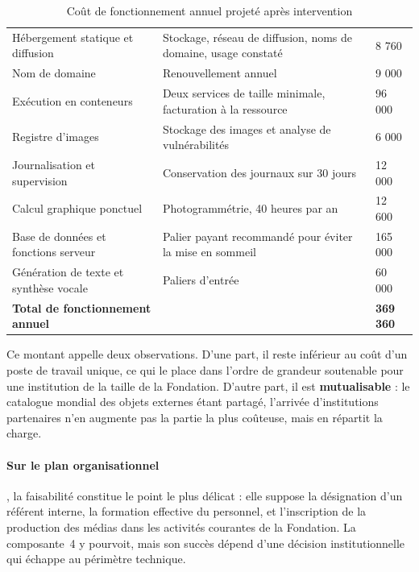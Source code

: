 \begin{table}[htbp]
\centering
\caption{Coût de fonctionnement annuel projeté après intervention}
\label{tab:coutfonctionnement}
\small
\begin{tabularx}{\textwidth}{|L{4.6cm}|X|R{2.6cm}|}
\hline
{}
 &  &  \\ \hline
Hébergement statique et diffusion & Stockage, réseau de diffusion, noms de domaine, usage constaté & 8 760 \\ \hline
Nom de domaine & Renouvellement annuel & 9 000 \\ \hline
Exécution en conteneurs & Deux services de taille minimale, facturation à la ressource & 96 000 \\ \hline
Registre d'images & Stockage des images et analyse de vulnérabilités & 6 000 \\ \hline
Journalisation et supervision & Conservation des journaux sur 30 jours & 12 000 \\ \hline
Calcul graphique ponctuel & Photogrammétrie, 40 heures par an & 12 600 \\ \hline
Base de données et fonctions serveur & Palier payant recommandé pour éviter la mise en sommeil & 165 000 \\ \hline
Génération de texte et synthèse vocale & Paliers d'entrée & 60 000 \\ \hline
{}
\textbf{Total de fonctionnement annuel} & & \textbf{369 360} \\ \hline
\end{tabularx}
\end{table}

Ce montant appelle deux observations. D'une part, il reste inférieur au coût
d'un poste de travail unique, ce qui le place dans l'ordre de grandeur
soutenable pour une institution de la taille de la Fondation. D'autre part, il
est \textbf{mutualisable} : le catalogue mondial des objets externes étant
partagé, l'arrivée d'institutions partenaires n'en augmente pas la partie la
plus coûteuse, mais en répartit la charge.

\paragraph{Sur le plan organisationnel}, la faisabilité constitue le point le plus délicat : elle suppose la désignation d'un
référent interne, la formation effective du personnel, et l'inscription de la
production des médias dans les activités courantes de la Fondation. La composante~4 y pourvoit, mais son succès dépend d'une décision institutionnelle
qui échappe au périmètre technique.

